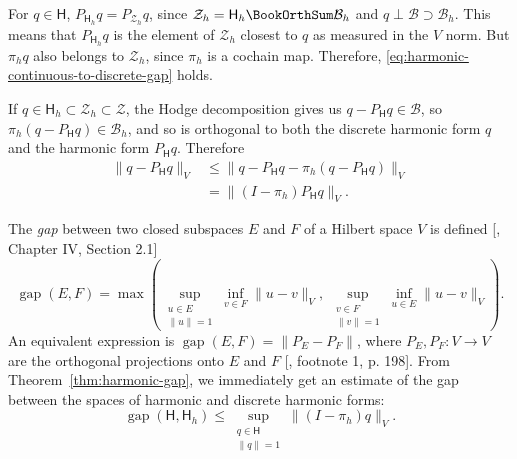\begin{Proof}
{For $q\in\mathsf H$, $P_{\mathsf H_h}q=P_{\mathcal Z_h}q$, since $\mathcal Z_h=\mathsf H_h\BookOrthSum\mathcal B_h$ and $q\perp\mathcal B\supset\mathcal B_h$. This means that $P_{\mathsf H_h}q$ is the element of $\mathcal Z_h$ closest to $q$ as measured in the $V$ norm. But $\pi_hq$ also belongs to $\mathcal Z_h$, since $\pi_h$ is a cochain map. Therefore, \eqref{eq:harmonic-continuous-to-discrete-gap} holds.}

{If $q\in\mathsf H_h\subset\mathcal Z_h\subset\mathcal Z$, the Hodge decomposition gives us $q-P_{\mathsf H}q\in\mathcal B$, so $\pi_h(q-P_{\mathsf H}q)\in\mathcal B_h$, and so is orthogonal to both the discrete harmonic form $q$ and the harmonic form $P_{\mathsf H}q$. Therefore}
\[
\begin{aligned}
\|q-P_{\mathsf H}q\|_V&\leq\|q-P_{\mathsf H}q-\pi_h(q-P_{\mathsf H}q)\|_V\\
&=\|(I-\pi_h)P_{\mathsf H}q\|_V.
\end{aligned}
\]
\end{Proof}

{The \emph{gap} between two closed subspaces $E$ and $F$ of a Hilbert space $V$ is defined [, Chapter IV, Section 2.1]}
\begin{equation}\label{eq:subspace-gap-definition}
\operatorname{gap}(E,F)=\max\left(\sup_{\substack{u\in E\\\|u\|=1}}\inf_{v\in F}\|u-v\|_V,\ \sup_{\substack{v\in F\\\|v\|=1}}\inf_{u\in E}\|u-v\|_V\right).
\end{equation}
{An equivalent expression is $\operatorname{gap}(E,F)=\|P_E-P_F\|$, where $P_E,P_F:V\to V$ are the orthogonal projections onto $E$ and $F$ [, footnote 1, p. 198]. From Theorem~\ref{thm:harmonic-gap}, we immediately get an estimate of the gap between the spaces of harmonic and discrete harmonic forms:}
\[
\operatorname{gap}(\mathsf H,\mathsf H_h)\leq\sup_{\substack{q\in\mathsf H\\\|q\|=1}}\|(I-\pi_h)q\|_V.
\]

